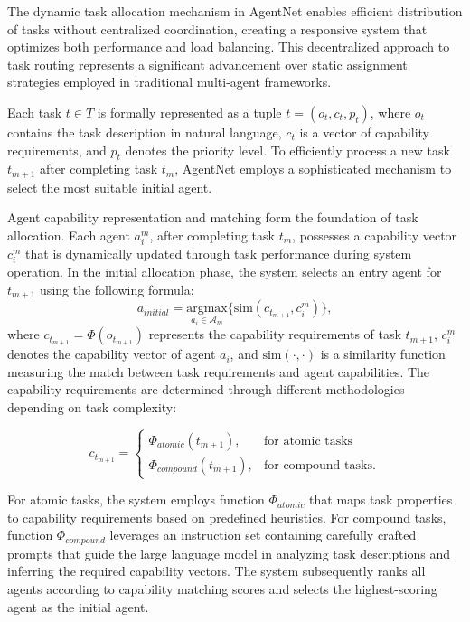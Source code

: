 \documentclass{article}
\begin{document}
The dynamic task allocation mechanism in AgentNet enables efficient distribution of tasks without centralized coordination, creating a responsive system that optimizes both performance and load balancing. This decentralized approach to task routing represents a significant advancement over static assignment strategies employed in traditional multi-agent frameworks.

Each task $t \in T$ is formally represented as a tuple $t = (o_t, c_t, p_t)$, where $o_t$ contains the task description in natural language, $c_t$ is a vector of capability requirements, and $p_t$ denotes the priority level. To efficiently process a new task $t_{m+1}$ after completing task $t_m$, AgentNet employs a sophisticated mechanism to select the most suitable initial agent.

Agent capability representation and matching form the foundation of task allocation. Each agent $a_i^m$, after completing task $t_m$, possesses a capability vector $c_i^m$ that is dynamically updated through task performance during system operation. In the initial allocation phase, the system selects an entry agent for $t_{m+1}$ using the following formula:
\begin{equation}
a_{initial} = \underset{a_i \in \mathcal{A}_m}{\text{argmax}} \{ \text{sim}(c_{t_{m+1}}, c_i^m) \},
\end{equation}
where $c_{t_{m+1}} = \Phi(o_{t_{m+1}})$ represents the capability requirements of task $t_{m+1}$, $c_i^m$ denotes the capability vector of agent $a_i$, and $\text{sim}(\cdot, \cdot)$ is a similarity function measuring the match between task requirements and agent capabilities. The capability requirements are determined through different methodologies depending on task complexity:

\begin{equation}
c_{t_{m+1}} = \begin{cases}
\Phi_{atomic}(t_{m+1}), & \text{for atomic tasks} \\
\Phi_{compound}(t_{m+1}), & \text{for compound tasks}.
\end{cases}
\end{equation}

For atomic tasks, the system employs function $\Phi_{atomic}$ that maps task properties to capability requirements based on predefined heuristics. For compound tasks, function $\Phi_{compound}$ leverages an instruction set containing carefully crafted prompts that guide the large language model in analyzing task descriptions and inferring the required capability vectors. The system subsequently ranks all agents according to capability matching scores and selects the highest-scoring agent as the initial agent.
\end{document}
